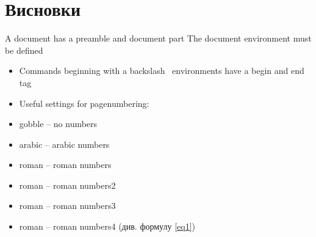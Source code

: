 
\section*{Висновки}

A document has a preamble and document part
The document environment must be defined
\begin{itemize}
	\item Commands beginning with a backslash \, environments have a begin and end tag
	\item Useful settings for pagenumbering:
	\item gobble – no numbers
	\item arabic – arabic numbers
	\item roman – roman numbers
	\item roman – roman numbers2
	\item roman – roman numbers3
	\item roman – roman numbers4 (див. формулу \eqref{eq1})
\end{itemize}